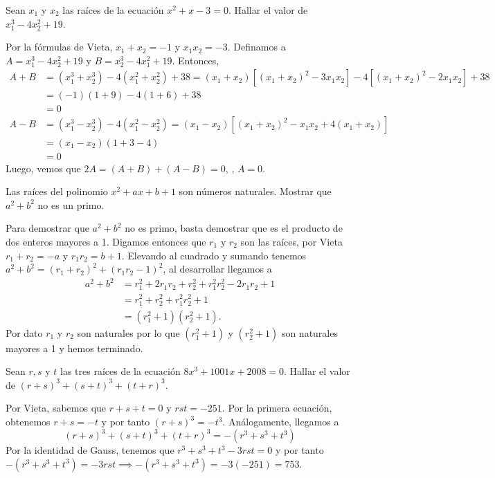 \begin{example}[CHNMOL, 1996]
    Sean $x_1$ y $x_2$ las raíces de la ecuación $x^2 + x - 3 = 0$.
    Hallar el valor de $x^3_1 - 4x_2^2 + 19$.
\end{example}
\begin{solution}
    Por la fórmulas de Vieta, $x_1 + x_2 = -1$ y $x_1 x_2 = -3$.
    Definamos a $A = x_1^3 - 4x_2^2 + 19$ y $B = x_2^3 - 4x_1^2 + 19$.
    Entonces,
    \begin{align*}
        A + B &= (x_1^3 + x_2^3) - 4(x_1^2 + x_2^2) + 38
        = (x_1 + x_2)\left[(x_1 + x_2)^2 - 3x_1 x_2\right] - 4\left[(x_1 + x_2)^2 - 2x_1 x_2\right] + 38\\
        &= (-1)(1 + 9) - 4(1 + 6) + 38\\
        &= 0\\[3mm]
        A - B &= (x_1^3 - x_2^3) - 4(x_1^2 - x_2^2)
        = (x_1 - x_2)\left[(x_1 + x_2)^2 - x_1 x_2 + 4(x_1 + x_2)\right]\\
        &= (x_1 - x_2)(1 + 3 - 4)\\
        &= 0
    \end{align*}
    Luego, vemos que $2A = (A + B) + (A - B) = 0$, \ie, $\boxed{A = 0}$.
\end{solution}

\begin{example}[URSS, 1986]
    Las raíces del polinomio $x^2 + ax + b + 1$ son números naturales.
    Mostrar que $a^2 + b^2$ no es un primo.
\end{example}
\begin{solution}
    Para demostrar que $a^2 + b^2$ no es primo, basta demostrar que es el producto de dos enteros mayores a 1.
    Digamos entonces que $r_1$ y $r_2$ son las raíces, por Vieta $r_1 + r_2 = -a$ y $r_1 r_2 = b + 1$.
    Elevando al cuadrado y sumando tenemos $a^2 + b^2 = (r_1 + r_2)^2 + (r_1 r_2 - 1)^2$, al desarrollar llegamos a
    \begin{align*}
        a^2 + b^2 &= r^2_1 + 2r_1 r_2 + r^2_2 + r^2_1 r^2_2 - 2r_1 r_2 + 1 \\
        &= r^2_1 + r^2_2 + r^2_1 r^2_2+ 1\\
        &= (r^2_1 + 1)(r^2_2 + 1).
    \end{align*}
    Por dato $r_1$ y $r_2$ son naturales por lo que $(r^2_1 + 1)$ y $(r^2_2 + 1)$ son naturales mayores a 1 y hemos terminado.
\end{solution}

\begin{example}[AIME II, 2008]
    Sean $r, s$ y $t$ las tres raíces de la ecuación $8x^3 + 1001x + 2008 = 0$.
    Hallar el valor de $(r + s)^3 + (s + t)^3 + (t + r)^3$.
\end{example}
\begin{solution}
    Por Vieta, sabemos que $r +  s + t = 0$ y $r s t = -251$.
    Por la primera ecuación, obtenemos $r + s = -t$ y por tanto $(r + s)^3 = - t^3$.
    Análogamente, llegamos a
    \[
        (r + s)^3 + (s + t)^3 + (t + r)^3 =  -(r^3 + s^3 + t^3)
    \]
    Por la identidad de Gauss, tenemos que $r^3 + s^3 + t^3 - 3rst = 0$ y por tanto $-(r^3 + s^3 + t^3) = -3rst \implies -(r^3 + s^3 + t^3) = -3(-251) = \boxed{753}$.
\end{solution}

